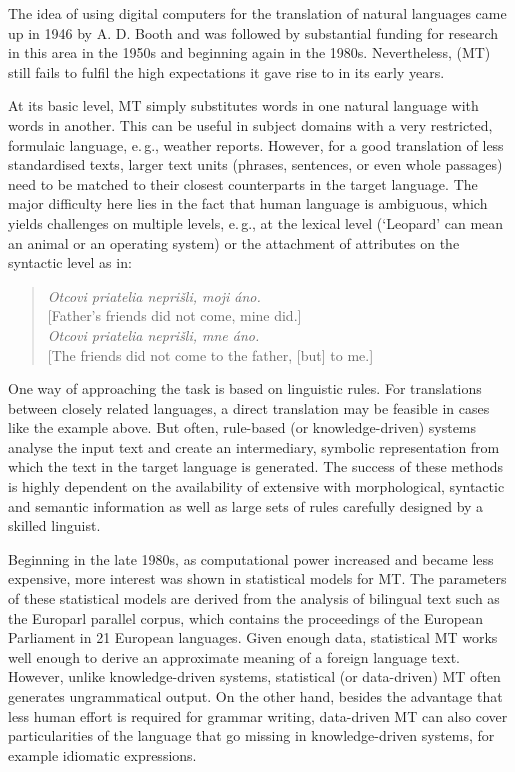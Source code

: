 \begin{multicols}{2}
The idea of using digital computers for the translation of natural languages came up in 1946 by A. D. Booth and was followed by substantial funding for research in this area in the 1950s and beginning again in the 1980s. Nevertheless,  (MT) still fails to fulfil the high expectations it gave rise to in its early years. 

At its basic level, MT simply substitutes words in one natural language with words in another. This can be useful in subject domains with a very restricted, formulaic language, e.\,g., weather reports. However, for a good translation of less standardised texts, larger text units (phrases, sentences, or even whole passages) need to be matched to their closest counterparts in the target language. The major difficulty here lies in the fact that human language is ambiguous, which yields challenges on multiple levels, e.\,g.,  at the lexical level (‘Leopard’ can mean an animal or an operating system) or the attachment of attributes on the syntactic level as in:

\begin{verse}
{\em Otcovi priatelia neprišli, moji áno.}\\
{[}Father's friends did not come, mine did.{]}\\
\smallskip
{\em Otcovi priatelia neprišli, mne áno.}\\
{[}The friends did not come to the father, {[}but{]} to me.{]}
\end{verse}

One way of approaching the task is based on linguistic rules. For translations between closely related languages, a direct translation may be feasible in cases like the example above. But often, rule-based (or knowledge-driven) systems analyse the input text and create an intermediary, symbolic representation from which the text in the target language is generated. The success of these methods is highly dependent on the availability of extensive  with morphological, syntactic and semantic information as well as large sets of  rules carefully designed by a skilled linguist.

Beginning in the late 1980s, as computational power increased and became less expensive, more interest was shown in statistical models for MT. The parameters of these statistical models are derived from the analysis of bilingual text  such as the Europarl parallel corpus, which contains the proceedings of the European Parliament in 21 European languages. Given enough data, statistical MT works well enough to derive an approximate meaning of a foreign language text. However, unlike knowledge-driven systems, statistical (or data-driven) MT often generates ungrammatical output. On the other hand, besides the advantage that less human effort is required for grammar writing, data-driven MT can also cover particularities of the language that go missing in knowledge-driven systems, for example idiomatic expressions. 


\end{multicols}
